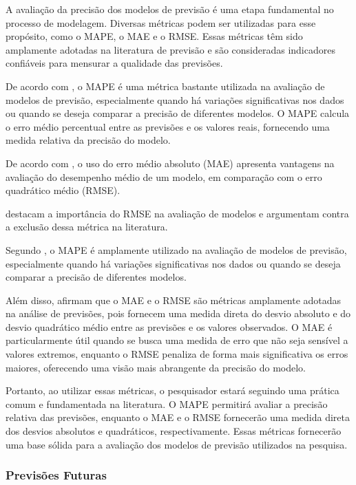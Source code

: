 A avaliação da precisão dos modelos de previsão é uma etapa fundamental no processo de modelagem. Diversas métricas podem ser utilizadas para esse propósito, como o MAPE, o MAE e o RMSE. Essas métricas têm sido amplamente adotadas na literatura de previsão e são consideradas indicadores confiáveis para mensurar a qualidade das previsões.

De acordo com , o MAPE é uma métrica bastante utilizada na avaliação de modelos de previsão, especialmente quando há variações significativas nos dados ou quando se deseja comparar a precisão de diferentes modelos. O MAPE calcula o erro médio percentual entre as previsões e os valores reais, fornecendo uma medida relativa da precisão do modelo.

De acordo com , o uso do erro médio absoluto (MAE) apresenta vantagens na avaliação do desempenho médio de um modelo, em comparação com o erro quadrático médio (RMSE).

 destacam a importância do RMSE na avaliação de modelos e argumentam contra a exclusão dessa métrica na literatura.

Segundo , o MAPE é amplamente utilizado na avaliação de modelos de previsão, especialmente quando há variações significativas nos dados ou quando se deseja comparar a precisão de diferentes modelos.

Além disso,  afirmam que o MAE e o RMSE são métricas amplamente adotadas na análise de previsões, pois fornecem uma medida direta do desvio absoluto e do desvio quadrático médio entre as previsões e os valores observados. O MAE é particularmente útil quando se busca uma medida de erro que não seja sensível a valores extremos, enquanto o RMSE penaliza de forma mais significativa os erros maiores, oferecendo uma visão mais abrangente da precisão do modelo.

Portanto, ao utilizar essas métricas, o pesquisador estará seguindo uma prática comum e fundamentada na literatura. O MAPE permitirá avaliar a precisão relativa das previsões, enquanto o MAE e o RMSE fornecerão uma medida direta dos desvios absolutos e quadráticos, respectivamente. Essas métricas fornecerão uma base sólida para a avaliação dos modelos de previsão utilizados na pesquisa.


\subsubsection{Previs\~oes Futuras}

